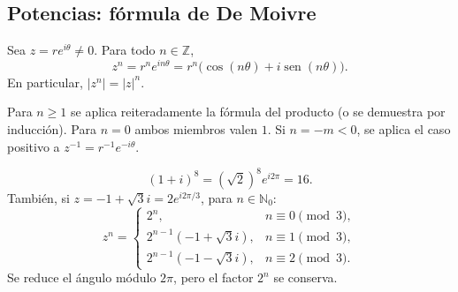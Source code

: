 \subsection{Potencias: fórmula de De Moivre}
\begin{proposicion}[{title={Fórmula de De Moivre}}]
Sea $z=re^{i\theta}\neq0$. Para todo $n\in\mathbb Z$,
\[
z^n=r^ne^{in\theta}
=r^n\bigl(\cos(n\theta)+i\operatorname{sen}(n\theta)\bigr).
\]
En particular, $|z^n|=|z|^n$.
\end{proposicion}
\begin{demostracion}
Para $n\geq1$ se aplica reiteradamente la fórmula del producto
(o se demuestra por inducción). Para $n=0$ ambos miembros valen $1$.
Si $n=-m<0$, se aplica el caso positivo a
$z^{-1}=r^{-1}e^{-i\theta}$.
\end{demostracion}
\begin{ejemplo}
\[
(1+i)^8=(\sqrt2)^8e^{i2\pi}=16.
\]
También, si $z=-1+\sqrt3i=2e^{i2\pi/3}$, para $n\in\mathbb N_0$:
\[
z^n=\begin{cases}
2^n,&n\equiv0\pmod3,\\
2^{n-1}(-1+\sqrt3i),&n\equiv1\pmod3,\\
2^{n-1}(-1-\sqrt3i),&n\equiv2\pmod3.
\end{cases}
\]
Se reduce el ángulo módulo $2\pi$, pero el factor $2^n$ se conserva.
\end{ejemplo}
